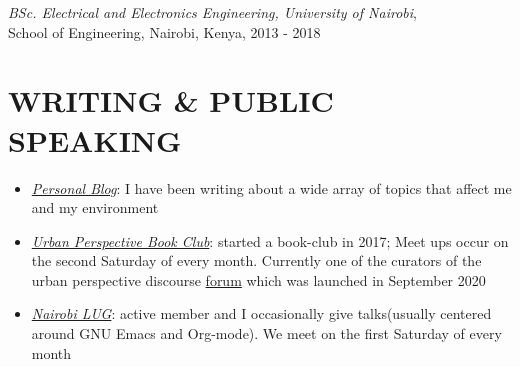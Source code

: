 \documentclass[margin, line]{res} %
\begin{document}
    {\sl BSc. Electrical and Electronics Engineering, University of Nairobi},\\ School of Engineering, Nairobi, Kenya, 2013 - 2018


    \section{WRITING \& PUBLIC SPEAKING}

    \begin{itemize}
    \item \href{https://bonfacemunyoki.com}{\textit{Personal Blog}}:  I have been writing about a wide array of topics that affect me and my environment
    \item \href{https://upbookclub.com/}{\textit{Urban Perspective Book Club}}: started a book-club in 2017; Meet ups occur on the second Saturday of every month. Currently one of the curators of the urban perspective discourse \href{https://upbookclub.com}{forum} which was launched in September 2020
    \item \href{https://nairobilug.or.ke/}{\textit{Nairobi LUG}}: active member and I occasionally give talks(usually centered around GNU Emacs and Org-mode). We meet on the first Saturday of every month
    \end{itemize}

\end{document}
